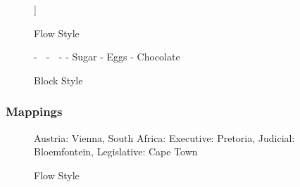 \begin{figure}[H]
  \begin{minipage}[t]{0.48\textwidth}
    \vspace{0pt}
    \begin{bchart}[max=9, width=0.85\textwidth]
    \end{bchart}
  \end{minipage}
  \begin{minipage}[t]{0.48\textwidth}
    \vspace{0pt}
    \begin{yamlcode}
      [🍎, 🍊,
        [Sugar, Eggs, Chocolate]
      ]
    \end{yamlcode}
  \end{minipage}
  \caption{Flow Style}
\end{figure}

\begin{figure}[H]
  \begin{minipage}[t]{0.48\textwidth}
    \vspace{0pt}
    \begin{bchart}[max=9, width=0.85\textwidth]
    \end{bchart}
  \end{minipage}
  \begin{minipage}[t]{0.48\textwidth}
    \vspace{0pt}
    \begin{yamlcode}
      - 🍎
      - 🍊
      - - Sugar
        - Eggs
        - Chocolate
    \end{yamlcode}
  \end{minipage}
  \caption{Block Style}
\end{figure}

\subsubsection{Mappings}

\begin{figure}[H]
  \begin{minipage}[t]{0.48\textwidth}
    \vspace{0pt}
    \begin{bchart}[max=9, width=0.85\textwidth]
    \end{bchart}
  \end{minipage}
  \begin{minipage}[t]{0.48\textwidth}
    \vspace{0pt}
    \begin{yamlcode}
      { Austria: Vienna,
        South Africa: {
          Executive: Pretoria,
          Judicial: Bloemfontein,
          Legislative: Cape Town }
      }
    \end{yamlcode}
  \end{minipage}
  \caption{Flow Style}
\end{figure}

